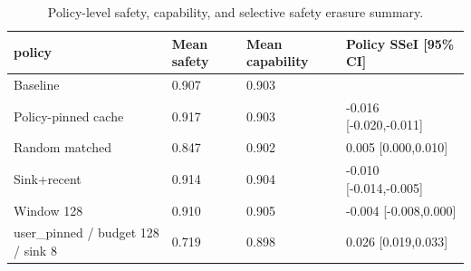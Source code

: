 \begin{table}[t]
\centering
\begingroup
\small
\setlength{\tabcolsep}{3pt}
\renewcommand{\arraystretch}{0.94}
\begin{tabularx}{\linewidth}{@{}lXXX@{}}
\toprule
policy & Mean safety & Mean capability & Policy SSeI [95\% CI] \\
\midrule
Baseline & 0.907 & 0.903 &  \\
Policy-pinned cache & 0.917 & 0.903 & -0.016 [-0.020,-0.011] \\
Random matched & 0.847 & 0.902 & 0.005 [0.000,0.010] \\
Sink+recent & 0.914 & 0.904 & -0.010 [-0.014,-0.005] \\
Window 128 & 0.910 & 0.905 & -0.004 [-0.008,0.000] \\
user\_pinned / budget 128 / sink 8 & 0.719 & 0.898 & 0.026 [0.019,0.033] \\
\bottomrule
\end{tabularx}
\endgroup
\caption{Policy-level safety, capability, and selective safety erasure summary.}
\label{tab:main-results}
\end{table}
